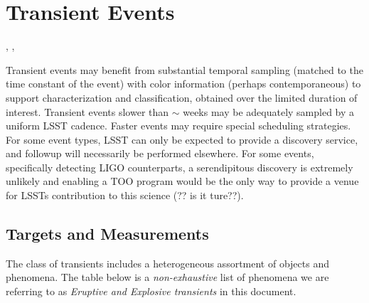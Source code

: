 \section{Transient Events}
\def\secname{\chpname:transients}\label{sec:\secname}

,
,

Transient events may benefit from substantial temporal sampling
(matched to the time constant of the event) with color information
(perhaps contemporaneous) to support characterization and
classification, obtained over the limited duration of interest.
Transient events slower than $\sim$ weeks may be adequately sampled by
a uniform LSST cadence.  Faster events may require special scheduling
strategies.  For some event types, LSST can only be expected to
provide a discovery service, and followup will necessarily be
performed elsewhere. For some events, specifically detecting LIGO counterparts, a serendipitous discovery is extremely unlikely and enabling a TOO program would be the only way to provide a venue for LSSTs contribution to this science (?? is it ture??).



\subsection{Targets and Measurements}
\label{sec:\secname:targets}

The class of transients includes a heterogeneous assortment of objects and phenomena. The table below is a \emph{non-exhaustive} list of phenomena we are referring to as \emph{Eruptive and Explosive transients} in this document. 

